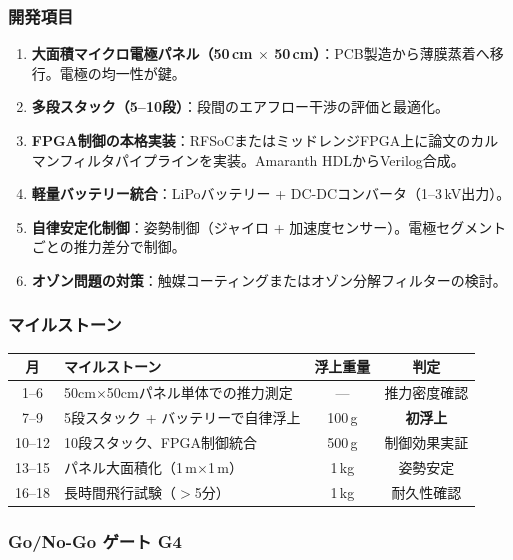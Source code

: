 \documentclass[12pt,a4paper]{ltjsarticle}
\begin{document}
\subsubsection{開発項目}
\begin{enumerate}[leftmargin=2em]
  \item \textbf{大面積マイクロ電極パネル（50\,cm $\times$ 50\,cm）}：PCB製造から薄膜蒸着へ移行。電極の均一性が鍵。
  \item \textbf{多段スタック（5--10段）}：段間のエアフロー干渉の評価と最適化。
  \item \textbf{FPGA制御の本格実装}：RFSoCまたはミッドレンジFPGA上に論文のカルマンフィルタパイプラインを実装。Amaranth HDLからVerilog合成。
  \item \textbf{軽量バッテリー統合}：LiPoバッテリー + DC-DCコンバータ（1--3\,kV出力）。
  \item \textbf{自律安定化制御}：姿勢制御（ジャイロ + 加速度センサー）。電極セグメントごとの推力差分で制御。
  \item \textbf{オゾン問題の対策}：触媒コーティングまたはオゾン分解フィルターの検討。
\end{enumerate}

\subsubsection{マイルストーン}
\begin{center}
\sffamily\small
\begin{tabular}{@{}clcc@{}}
\toprule
\textbf{月} & \textbf{マイルストーン} & \textbf{浮上重量} & \textbf{判定} \\
\midrule
1--6 & 50cm$\times$50cmパネル単体での推力測定 & --- & 推力密度確認 \\
7--9 & 5段スタック + バッテリーで自律浮上 & 100\,g & \textbf{初浮上} \\
10--12 & 10段スタック、FPGA制御統合 & 500\,g & 制御効果実証 \\
13--15 & パネル大面積化（1\,m$\times$1\,m） & 1\,kg & 姿勢安定 \\
16--18 & 長時間飛行試験（$>$5分） & 1\,kg & 耐久性確認 \\
\bottomrule
\end{tabular}
\end{center}

\subsubsection{Go/No-Go ゲート G4}
\end{document}
